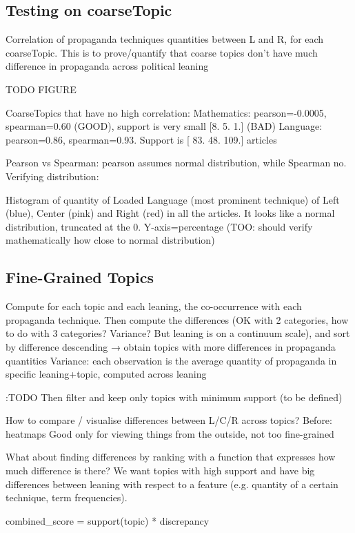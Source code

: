 \subsection{Testing on coarseTopic}
Correlation of propaganda techniques quantities between L and R, for each coarseTopic. This is to prove/quantify that coarse topics don’t have much difference in propaganda across political leaning

TODO FIGURE

CoarseTopics that have no high correlation:
Mathematics: pearson=-0.0005, spearman=0.60 (GOOD), support is very small [8. 5. 1.] (BAD)
Language: pearson=0.86, spearman=0.93. Support is [ 83.  48. 109.] articles

Pearson vs Spearman: pearson assumes normal distribution, while Spearman no.
Verifying distribution:

Histogram of quantity of Loaded Language (most prominent technique) of Left (blue), Center (pink) and Right (red) in all the articles. It looks like a normal distribution, truncated at the 0. Y-axis=percentage (TOO: should verify mathematically how close to normal distribution)

\subsection{Fine-Grained Topics}

Compute for each topic and each leaning, the co-occurrence with each propaganda technique. Then compute the differences (OK with 2 categories, how to do with 3 categories? Variance? But leaning is on a continuum scale), and sort by difference descending → obtain topics with more differences in propaganda quantities
Variance: each observation is the average quantity of propaganda in specific leaning+topic, computed across leaning


:TODO
Then filter and keep only topics with minimum support (to be defined)

How to compare / visualise differences between L/C/R across topics?
Before: heatmaps
Good only for viewing things from the outside, not too fine-grained

What about finding differences by ranking with a function that expresses how much difference is there?
We want topics with high support and have big differences between leaning with respect to a feature (e.g. quantity of a certain technique, term frequencies).

combined\_score = support(topic) * discrepancy

